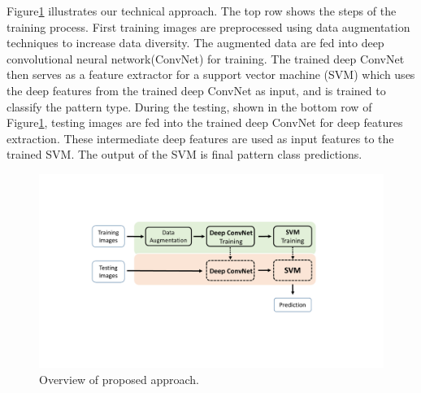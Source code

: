 
Figure\ref{fig.method} illustrates our technical approach.   
%
The top row shows the steps of the training process.  First training images are preprocessed using data augmentation techniques to increase data diversity. 
The augmented data are fed into deep convolutional neural network(ConvNet) for training. The trained deep ConvNet then serves as a feature extractor for a support vector machine (SVM) which uses the deep features from the trained deep ConvNet as input, and is trained to classify the pattern type.
%
During the testing, shown in the bottom row of Figure\ref{fig.method}, testing images are fed into the trained deep ConvNet for deep features extraction. These intermediate deep features are used as input features to the trained SVM. The output of the SVM is final pattern class predictions.


\begin{figure}[!ht]
	\begin{center}
		\includegraphics[scale=0.38,clip=true,trim = 50mm 55mm 28mm 50mm]{fig/figs/method_overview.pdf}
	\end{center}
	\caption{Overview of proposed approach.} 
	\label{fig.method}
\end{figure}

